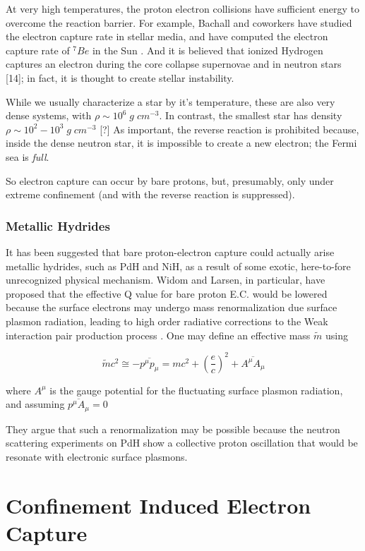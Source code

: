 \documentclass[%
 aip,
 jmp,%
 amsmath,amssymb,
 reprint,%
]{revtex4-1}
\begin{document}
At very high temperatures, the proton electron collisions have sufficient energy to overcome the reaction barrier.   For example, Bachall and coworkers have studied the electron capture rate in stellar media, and have computed the electron capture rate of $^{7}Be$ in the Sun \cite{bachall62,bachall69}. And it is believed that ionized Hydrogen captures an electron during the core collapse supernovae and in neutron stars [14]; in fact, it is thought to create stellar instability.   

While we usually characterize a star by it's temperature, these are also very dense systems, with $\rho\sim 10^6\;g\;cm^{-3}$.  In contrast, the smallest star has density $\rho\sim 10^{2}-10^{3}\;g\;cm^{-3}$ [?]  As important, the reverse reaction is prohibited because, inside the dense neutron star, it is impossible to create a new electron; the Fermi sea is \emph{full}.

So electron capture can occur by bare protons, but, presumably, only under extreme confinement (and with the reverse reaction is suppressed).

\subsubsection{Metallic Hydrides}

It has been suggested that bare proton-electron capture could actually arise metallic hydrides, such as PdH and NiH, as a result of some exotic, here-to-fore unrecognized physical mechanism.  Widom and Larsen, in particular, have proposed that the effective Q value for bare proton E.C. would be lowered because the surface electrons may undergo mass renormalization due surface plasmon radiation, leading to high order radiative corrections to the Weak interaction pair production process \cite{widlar1}.  One may define an effective mass $\tilde{m}$ using

$$\tilde{m}c^{2}\cong-\overline{p^{\mu}p_{\mu}}=mc^{2}+\left(\dfrac{e}{c}\right)^2+\overline{A^{\mu}A_{\mu}}$$

where $A^{\mu}$ is the gauge potential for the fluctuating surface plasmon radiation, and assuming $\overline{p^{\mu}A_{\mu}}=0$

They argue that such a renormalization may be possible because the neutron scattering experiments on PdH show a collective proton oscillation that would be resonate with electronic surface plasmons.



\section{Confinement Induced Electron Capture}
\end{document}
